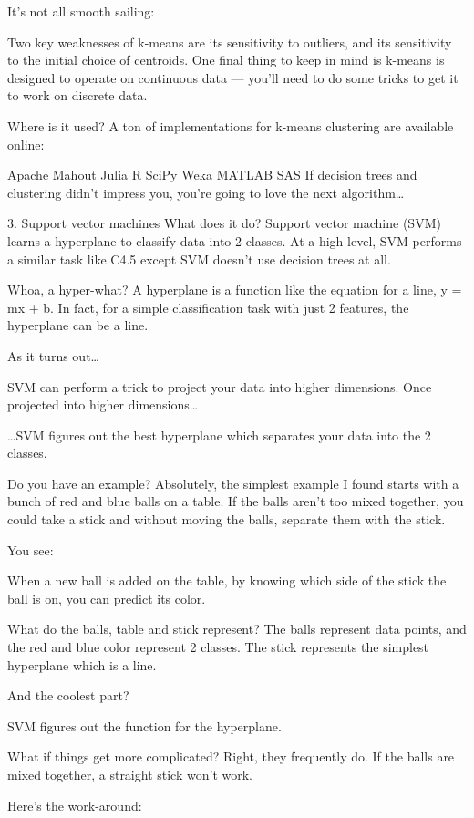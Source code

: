 It’s not all smooth sailing:

Two key weaknesses of k-means are its sensitivity to outliers, and its sensitivity to the initial choice of centroids. One final thing to keep in mind is k-means is designed to operate on continuous data — you’ll need to do some tricks to get it to work on discrete data.

Where is it used? A ton of implementations for k-means clustering are available online:

Apache Mahout
Julia
R
SciPy
Weka
MATLAB
SAS
If decision trees and clustering didn’t impress you, you’re going to love the next algorithm…

3. Support vector machines
What does it do? Support vector machine (SVM) learns a hyperplane to classify data into 2 classes. At a high-level, SVM performs a similar task like C4.5 except SVM doesn’t use decision trees at all.

Whoa, a hyper-what? A hyperplane is a function like the equation for a line, y = mx + b. In fact, for a simple classification task with just 2 features, the hyperplane can be a line.

As it turns out…

SVM can perform a trick to project your data into higher dimensions. Once projected into higher dimensions…

…SVM figures out the best hyperplane which separates your data into the 2 classes.

Do you have an example? Absolutely, the simplest example I found starts with a bunch of red and blue balls on a table. If the balls aren’t too mixed together, you could take a stick and without moving the balls, separate them with the stick.

You see:

When a new ball is added on the table, by knowing which side of the stick the ball is on, you can predict its color.

What do the balls, table and stick represent? The balls represent data points, and the red and blue color represent 2 classes. The stick represents the simplest hyperplane which is a line.

And the coolest part?

SVM figures out the function for the hyperplane.

What if things get more complicated? Right, they frequently do. If the balls are mixed together, a straight stick won’t work.

Here’s the work-around:

